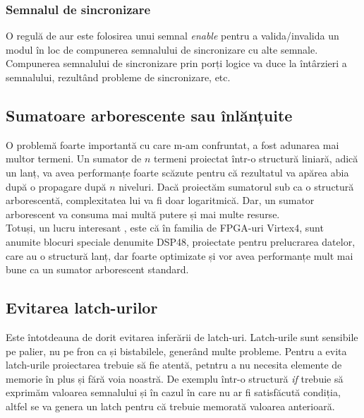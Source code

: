 \documentclass[12pt,twoside,a4paper,fleqn]{book}
\begin{document}
\subsubsection{Semnalul de sincronizare}
O regulă de aur este folosirea unui semnal \emph{enable} pentru a valida/invalida un modul în loc de compunerea semnalului de sincronizare cu alte semnale. Compunerea semnalului de sincronizare prin porți logice va duce la întârzieri a semnalului, rezultând probleme de sincronizare, etc.


\subsection{Sumatoare arborescente sau înlănțuite}
O problemă foarte importantă cu care m-am confruntat, a fost adunarea mai multor termeni. Un sumator de $n$ termeni proiectat într-o structură liniară, adică un lanț, va avea performanțe foarte scăzute pentru că rezultatul va apărea abia după o propagare după $n$ niveluri. Dacă proiectăm sumatorul sub ca o structură arborescentă, complexitatea lui va fi doar logaritmică. Dar, un sumator arborescent va consuma mai multă putere și mai multe resurse.\\
Totuși, un lucru interesant \cite{xilinx_coding_practices}, este că în familia de FPGA-uri Virtex4, sunt anumite blocuri speciale denumite DSP48, proiectate pentru prelucrarea datelor, care au o structură lanț, dar foarte optimizate și vor avea performanțe mult mai bune ca un sumator arborescent standard.

\subsection{Evitarea latch-urilor}
Este întotdeauna de dorit evitarea inferării de latch-uri. Latch-urile sunt sensibile pe palier, nu pe fron ca și bistabilele, generând multe probleme. Pentru a evita latch-urile proiectarea trebuie să fie atentă, petntru a nu necesita elemente de memorie în plus și fără voia noastră. De exemplu într-o structură \emph{if} trebuie să exprimăm valoarea semnalului și în cazul în care nu ar fi satisfăcută condiția, altfel se va genera un latch pentru că trebuie memorată valoarea anterioară.
\end{document}
